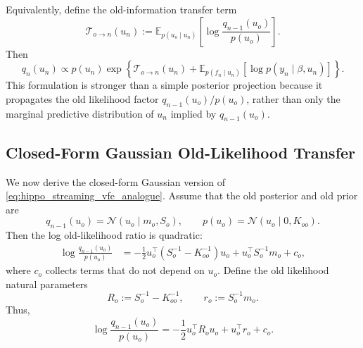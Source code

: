 \documentclass[12pt]{article}
\newcommand{\E}{\mathbb{E}}
\begin{document}
Equivalently, define the old-information transfer term
\begin{equation}
    \mathcal{T}_{o\rightarrow n}(u_n)
    :=
    \E_{p(u_o\mid u_n)}
    \left[
        \log
        \frac{
            q_{n-1}(u_o)
        }{
            p(u_o)
        }
    \right].
    \label{eq:old_likelihood_transfer_term}
\end{equation}
Then
\begin{equation}
    q_n(u_n)
    \propto
    p(u_n)
    \exp
    \left\{
        \mathcal{T}_{o\rightarrow n}(u_n)
        +
        \E_{p(f_n\mid u_n)}
        \left[
            \log p(y_n\mid \beta,u_n)
        \right]
    \right\}.
\end{equation}
This formulation is stronger than a simple posterior projection because it propagates
the old likelihood factor \(q_{n-1}(u_o)/p(u_o)\), rather than only the marginal
predictive distribution of \(u_n\) implied by \(q_{n-1}(u_o)\).

\subsection{Closed-Form Gaussian Old-Likelihood Transfer}
\label{subsec:closed_form_old_likelihood_transfer}

We now derive the closed-form Gaussian version of
\eqref{eq:hippo_streaming_vfe_analogue}. Assume that the old posterior and old prior are
\begin{equation}
    q_{n-1}(u_o)
    =
    \mathcal{N}(u_o\mid m_o,S_o),
    \qquad
    p(u_o)
    =
    \mathcal{N}(u_o\mid 0,K_{oo}).
\end{equation}
Then the log old-likelihood ratio is quadratic:
\begin{align}
    \log
    \frac{
        q_{n-1}(u_o)
    }{
        p(u_o)
    }
    &=
    -\frac{1}{2}
    u_o^\top
    \left(
        S_o^{-1}-K_{oo}^{-1}
    \right)
    u_o
    +
    u_o^\top S_o^{-1}m_o
    +
    c_o ,
\end{align}
where \(c_o\) collects terms that do not depend on \(u_o\). Define the old likelihood
natural parameters
\begin{equation}
    R_o
    :=
    S_o^{-1}-K_{oo}^{-1},
    \qquad
    r_o
    :=
    S_o^{-1}m_o .
    \label{eq:old_likelihood_natural_params}
\end{equation}
Thus,
\begin{equation}
    \log
    \frac{
        q_{n-1}(u_o)
    }{
        p(u_o)
    }
    =
    -\frac{1}{2}u_o^\top R_o u_o
    +
    u_o^\top r_o
    +
    c_o .
    \label{eq:old_likelihood_ratio_quadratic}
\end{equation}
\end{document}
